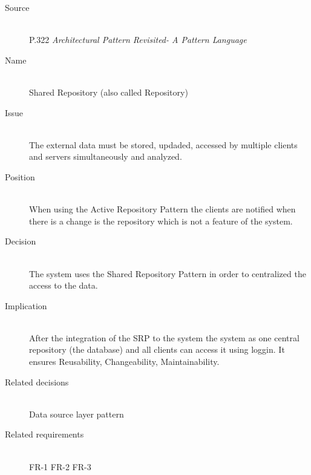 \begin{description}
\item [Source]~\\
\EAA P.322 \cite{eaa}
\textit{Architectural Pattern Revisited- A Pattern Language} \\

 \item [Name]~\\ Shared Repository (also called Repository) \\
 \item [Issue]~\\ The external data must be stored, updaded, accessed by multiple clients and servers simultaneously and analyzed.\\
 \item [Position]~\\ When using the Active Repository Pattern the clients are notified when there is a change is the repository which is not a feature of the system.\\
 \item [Decision]~\\ The system uses the Shared Repository Pattern in order to centralized the access to the data.\\
 \item [Implication]~\\ After the integration of the SRP to the system the system as one central repository (the database) and all clients can access it using loggin. It ensures Reusability, Changeability, Maintainability. \\
\item [Related decisions]~\\ Data source layer pattern \\
\item [Related requirements]~\\ FR-1 FR-2 FR-3 \\
 
 \end{description}



